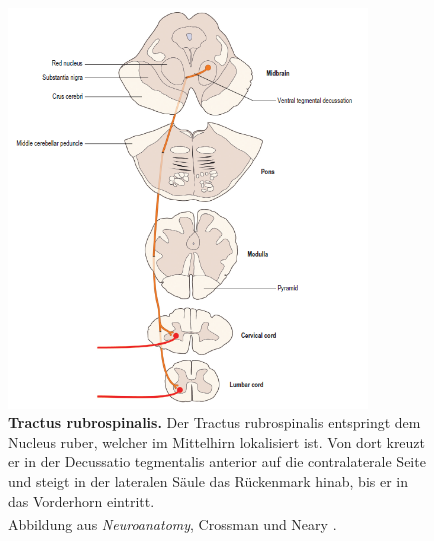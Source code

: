 \documentclass[12pt,a4paper,pdftex]{article}
\begin{document}
\begin{figure}[H]
    \centering
    \includegraphics[width=0.85\textwidth]{pictures/Bilder_Laura/rubrospinal_tract.PNG}
    \caption[Tractus rubrospinalis]{\textbf{Tractus rubrospinalis.} Der Tractus rubrospinalis entspringt dem Nucleus ruber, welcher im Mittelhirn lokalisiert ist. Von dort kreuzt er in der Decussatio tegmentalis anterior auf die contralaterale Seite und steigt in der lateralen Säule das Rückenmark hinab, bis er in das Vorderhorn eintritt. \\
    Abbildung aus \textit{Neuroanatomy}, Crossman und Neary \textsuperscript{\cite[8]{crossman2014neuroanatomy}}.}
    \label{fig:tr_rubrospinalis}
\end{figure}
\end{document}

